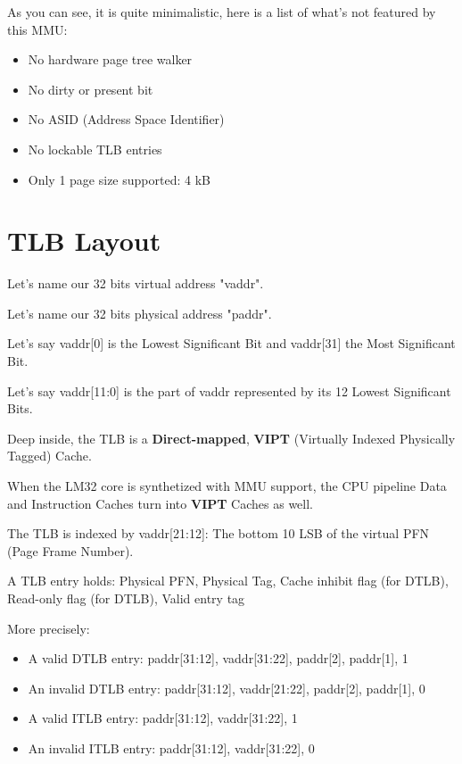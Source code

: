 \documentclass[a4paper,11pt]{article}
\begin{document}
As you can see, it is quite minimalistic, here is a list of what's not featured by this MMU:

\begin{itemize}
	\item No hardware page tree walker
	\item No dirty or present bit
	\item No ASID (Address Space Identifier)
	\item No lockable TLB entries
	\item Only 1 page size supported: 4 kB
\end{itemize}

\section{TLB Layout}

Let's name our 32 bits virtual address "vaddr".

Let's name our 32 bits physical address "paddr".

Let's say vaddr[0] is the Lowest Significant Bit and vaddr[31] the Most Significant Bit.

Let's say vaddr[11:0] is the part of vaddr represented by its 12 Lowest Significant Bits.
\newline

Deep inside, the TLB is a \textbf{Direct-mapped}, \textbf{VIPT} (Virtually Indexed Physically Tagged) Cache.
\newline

When the LM32 core is synthetized with MMU support, the CPU pipeline Data and Instruction Caches turn into \textbf{VIPT} Caches as well.
\newline

The TLB is indexed by vaddr[21:12]: The bottom 10 LSB of the virtual PFN (Page Frame Number).
\newline

A TLB entry holds: Physical PFN, Physical Tag, Cache inhibit flag (for DTLB), Read-only flag (for DTLB), Valid entry tag
\newline

More precisely:

\begin{itemize}
	\item A valid DTLB entry: paddr[31:12], vaddr[31:22], paddr[2], paddr[1], 1
	\item An invalid DTLB entry: paddr[31:12], vaddr[21:22], paddr[2], paddr[1], 0
	\item A valid ITLB entry: paddr[31:12], vaddr[31:22], 1
	\item An invalid ITLB entry: paddr[31:12], vaddr[31:22], 0
\end{itemize}
\end{document}
